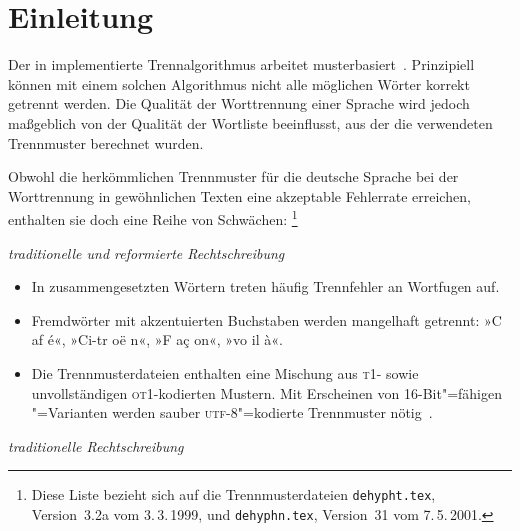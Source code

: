 \documentclass[11pt,
               DIV=9,
               toc=flat,
               captions=tableheading,
               abstract=on]{scrartcl}
\newcommand*{\Abk}[1]{\mbox{\textsc{\lsstyle#1}}}
\newcommand*{\Datei}[1]{\texttt{#1}}
\newcommand*{\trennung}[2]{%
  \makebox[0pt][l]{%
    \color{#1}%
    \smash{\rule[-3.5pt]{\widthof{#2}}{.7pt}}%
  }%
  #2%
}
\newcommand*{\ftr}[1]{\trennung{falschcol}{#1}}%
\begin{document}
\clearpage
\begin{multicols}{2}
  \RaggedRight
  \small
  \tableofcontents
\end{multicols}


\section{Einleitung}
\label{sec:einleitung}

Der in  implementierte Trennalgorithmus arbeitet
musterbasiert~\cite{liang:1983}.  Prinzipiell können mit einem solchen
Algorithmus nicht alle möglichen Wörter korrekt getrennt werden.  Die
Qualität der Worttrennung einer Sprache wird jedoch maßgeblich von der
Qualität der Wortliste beeinflusst, aus der die verwendeten
Trennmuster berechnet wurden.

Obwohl die herkömmlichen Trennmuster für die deutsche Sprache bei der
Worttrennung in gewöhnlichen Texten eine akzeptable Fehlerrate
erreichen, enthalten sie doch eine Reihe von Schwächen:%
\footnote{Diese Liste bezieht sich auf die Trennmusterdateien
  \Datei{dehypht.tex}, Version~3.2a vom 3.\,3.\,1999, und
  \Datei{dehyphn.tex}, Version~31 vom 7.\,5.\,2001.}

\bigskip\smallskip
{}
\noindent\textit{traditionelle und reformierte Rechtschreibung}

\begin{itemize}
\item In zusammengesetzten Wörtern treten häufig Trennfehler an
  Wortfugen auf.

\item Fremdwörter mit akzentuierten Buchstaben werden mangelhaft
  getrennt: »C\ftr{af}é«, »Ci-tr\ftr{oë}n«, »F\ftr{aç}on«,
  »vo\ftr{il}à«.

\item Die Trennmusterdateien enthalten eine Mischung aus \Abk{t1}-
  sowie unvollständigen \Abk{ot1}-kodierten Mustern.  Mit Erscheinen
  von 16-Bit"=fähigen "=Varianten werden sauber
  \Abk{utf-8}"=kodierte Trennmuster nötig~\cite{miklavec:2008}.
\end{itemize}

\bigskip
{}
\noindent\textit{traditionelle Rechtschreibung}
\end{document}
